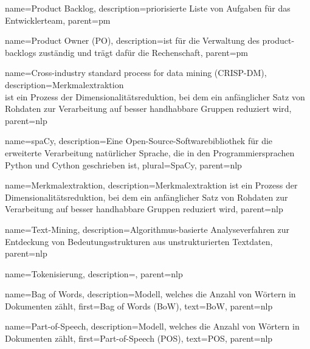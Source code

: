 {
        name=Product Backlog,
        description={priorisierte Liste von Aufgaben für das Entwicklerteam},
        parent=pm
}

{
        name=Product Owner (PO),
        description={ist für die Verwaltung des \Glspl{product-backlog} zuständig und trägt dafür die Rechenschaft},
        parent=pm
}


{
        name=Cross-industry standard process for data mining (CRISP-DM),
        description={Merkmalextraktion\\ist ein Prozess der Dimensionalitätsreduktion, bei dem ein anfänglicher Satz von Rohdaten zur Verarbeitung auf besser handhabbare Gruppen reduziert wird},
        parent=nlp
}


{
        name=spaCy,
        description={Eine Open-Source-Softwarebibliothek für die erweiterte Verarbeitung natürlicher Sprache, die in den Programmiersprachen Python und Cython geschrieben ist},
        plural={SpaCy},
        parent=nlp
}

{
        name=Merkmalextraktion,
        description={Merkmalextraktion ist ein Prozess der Dimensionalitätsreduktion, bei dem ein anfänglicher Satz von Rohdaten zur Verarbeitung auf besser handhabbare Gruppen reduziert wird},
        parent=nlp
}

{
        name=Text-Mining,
        description={Algorithmus-basierte Analyseverfahren zur Entdeckung von Bedeutungsstrukturen aus unstrukturierten Textdaten},
        parent=nlp
}

{
        name=Tokenisierung,
        description={},
        parent=nlp
}

{
   name={Bag of Words},                                      %
   description={Modell, welches die Anzahl von Wörtern in Dokumenten zählt},                      %
   first={Bag of Words (BoW)},           
   text={BoW},
        parent=nlp
} 

{
   name={Part-of-Speech},                                      %
   description={Modell, welches die Anzahl von Wörtern in Dokumenten zählt},                      %
   first={Part-of-Speech (POS)},
   text={POS},
        parent=nlp
} 
